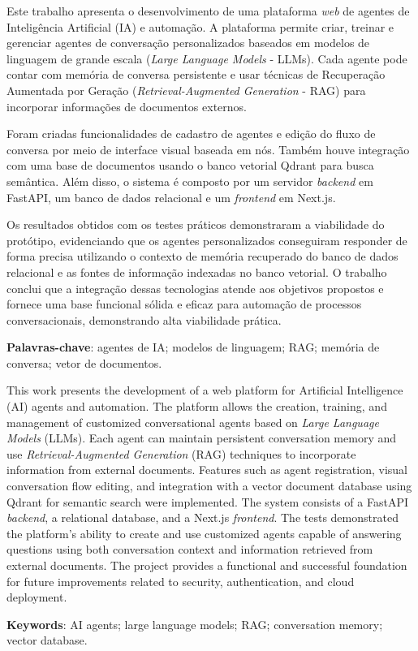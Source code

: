 \documentclass[12pt, openright, oneside, a4paper, brazil]{ads-unipac-abntex2}
\begin{document}
\begin{resumo}
Este trabalho apresenta o desenvolvimento de uma plataforma \textit{web} de agentes de Inteligência Artificial (IA) e automação. A plataforma permite criar, treinar e gerenciar agentes de conversação personalizados baseados em modelos de linguagem de grande escala (\textit{Large Language Models} - LLMs). Cada agente pode contar com memória de conversa persistente e usar técnicas de Recuperação Aumentada por Geração (\textit{Retrieval-Augmented Generation} - RAG) para incorporar informações de documentos externos.

Foram criadas funcionalidades de cadastro de agentes e edição do fluxo de conversa por meio de interface visual baseada em nós. Também houve integração com uma base de documentos usando o banco vetorial Qdrant para busca semântica. Além disso, o sistema é composto por um servidor \textit{backend} em FastAPI, um banco de dados relacional e um \textit{frontend} em Next.js.

Os resultados obtidos com os testes práticos demonstraram a viabilidade do protótipo, evidenciando que os agentes personalizados conseguiram responder de forma precisa utilizando o contexto de memória recuperado do banco de dados relacional e as fontes de informação indexadas no banco vetorial. O trabalho conclui que a integração dessas tecnologias atende aos objetivos propostos e fornece uma base funcional sólida e eficaz para automação de processos conversacionais, demonstrando alta viabilidade prática.

\noindent\textbf{Palavras-chave}: agentes de IA; modelos de linguagem; RAG; memória de conversa; vetor de documentos.
\end{resumo}

\begin{resumo}[Abstract]
This work presents the development of a web platform for Artificial Intelligence (AI) agents and automation. The platform allows the creation, training, and management of customized conversational agents based on \textit{Large Language Models} (LLMs). Each agent can maintain persistent conversation memory and use \textit{Retrieval-Augmented Generation} (RAG) techniques to incorporate information from external documents. Features such as agent registration, visual conversation flow editing, and integration with a vector document database using Qdrant for semantic search were implemented. The system consists of a FastAPI \textit{backend}, a relational database, and a Next.js \textit{frontend}. The tests demonstrated the platform's ability to create and use customized agents capable of answering questions using both conversation context and information retrieved from external documents. The project provides a functional and successful foundation for future improvements related to security, authentication, and cloud deployment.

\noindent\textbf{Keywords}: AI agents; large language models; RAG; conversation memory; vector database.
\end{resumo}
\end{document}
